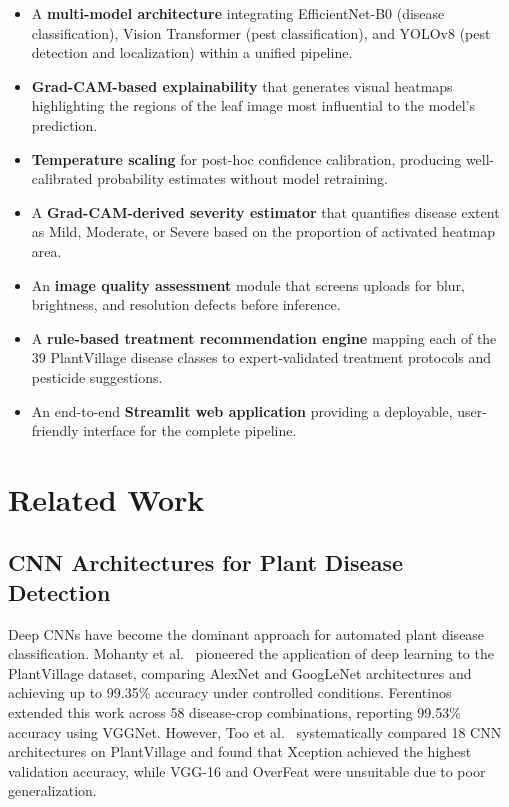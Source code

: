 \documentclass[conference]{IEEEtran}
\begin{document}
\begin{itemize}
    \item A \textbf{multi-model architecture} integrating EfficientNet-B0 (disease classification), Vision Transformer (pest classification), and YOLOv8 (pest detection and localization) within a unified pipeline.
    \item \textbf{Grad-CAM-based explainability} that generates visual heatmaps highlighting the regions of the leaf image most influential to the model's prediction.
    \item \textbf{Temperature scaling} for post-hoc confidence calibration, producing well-calibrated probability estimates without model retraining.
    \item A \textbf{Grad-CAM-derived severity estimator} that quantifies disease extent as Mild, Moderate, or Severe based on the proportion of activated heatmap area.
    \item An \textbf{image quality assessment} module that screens uploads for blur, brightness, and resolution defects before inference.
    \item A \textbf{rule-based treatment recommendation engine} mapping each of the 39 PlantVillage disease classes to expert-validated treatment protocols and pesticide suggestions.
    \item An end-to-end \textbf{Streamlit web application} providing a deployable, user-friendly interface for the complete pipeline.
\end{itemize}

\section{Related Work}

\subsection{CNN Architectures for Plant Disease Detection}
Deep CNNs have become the dominant approach for automated plant disease classification. Mohanty et al.~\cite{mohanty2016} pioneered the application of deep learning to the PlantVillage dataset, comparing AlexNet and GoogLeNet architectures and achieving up to 99.35\% accuracy under controlled conditions. Ferentinos~\cite{ferentinos2018} extended this work across 58 disease-crop combinations, reporting 99.53\% accuracy using VGGNet. However, Too et al.~\cite{too2019} systematically compared 18 CNN architectures on PlantVillage and found that Xception achieved the highest validation accuracy, while VGG-16 and OverFeat were unsuitable due to poor generalization.
\end{document}
